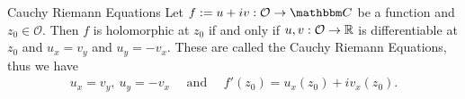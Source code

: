 \documentclass[../ComplexAnalysis_Notes.tex]{subfiles}
\begin{document}
\begin{Thm}{Cauchy Riemann Equations}{}
Let $f := u + iv : \mathcal{O} \to \C$ be a function and $z_0 \in \mathcal{O}$. Then $f$ is holomorphic at $z_0$ if and only if $u,v : \mathcal{O} \to \mathbb{R}$ is differentiable at $z_0$ and $u_x = v_y$ and $u_y = - v_x$. These are called the Cauchy Riemann Equations, thus we have 
\begin{align*}
    u_x = v_y, \ u_y = -v_x \quad \mbox{ and } \quad f'(z_0) = u_x(z_0) + i v_x(z_0).
\end{align*}
\end{Thm}
\end{document}

